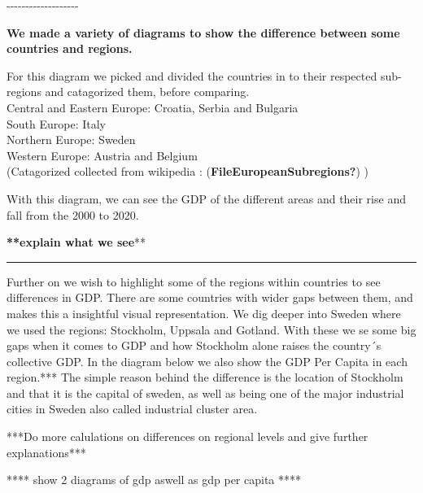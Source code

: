 \documentclass[
  a4paper,
  DIV=11,
  numbers=noendperiod]{scrartcl}
\begin{document}
-\/-\/-\/-\/-\/-\/-\/-\/-\/-\/-\/-\/-\/-\/-\/-\/-\/-\/-

\textbf{We made a variety of diagrams to show the difference between
some countries and regions.}

For this diagram we picked and divided the countries in to their
respected sub-regions and catagorized them, before comparing.\\

Central and Eastern Europe: Croatia, Serbia and Bulgaria\\

South Europe: Italy\\

Northern Europe: Sweden\\

Western Europe: Austria and Belgium\\

(Catagorized collected from wikipedia :
(\textbf{FileEuropeanSubregions?}) )

With this diagram, we can see the GDP of the different areas and their
rise and fall from the 2000 to 2020.

\textbf{**explain what we see}**\\

\begin{center}\rule{0.5\linewidth}{0.5pt}\end{center}

Further on we wish to highlight some of the regions within countries to
see differences in GDP. There are some countries with wider gaps between
them, and makes this a insightful visual representation. We dig deeper
into Sweden where we used the regions: Stockholm, Uppsala and Gotland.
With these we se some big gaps when it comes to GDP and how Stockholm
alone raises the country´s collective GDP. In the diagram below we also
show the GDP Per Capita in each region.*** The simple reason behind the
difference is the location of Stockholm and that it is the capital of
sweden, as well as being one of the major industrial cities in Sweden
also called industrial cluster area.

***Do more calulations on differences on regional levels and give
further explanations***\\

\hfill\break

**** show 2 diagrams of gdp aswell as gdp per capita ****
\end{document}
